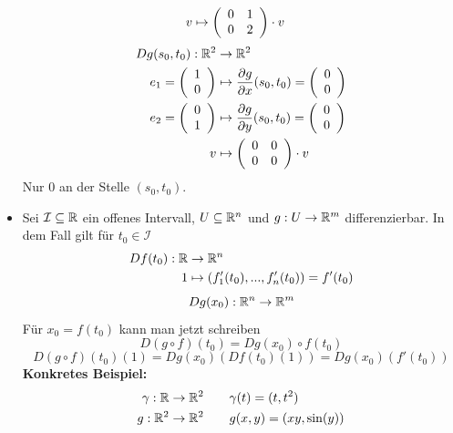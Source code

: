 \documentclass[main.tex]{subfiles}
\begin{document}
\begin{Beispiel}
\begin{itemize}
$$\begin{aligned}
          v & \mapsto \left(\begin{array}{c c} 0 & 1 \\ 0 & 2 \end{array}\right) \cdot v
        \end{aligned}$$
        $$\begin{aligned}
          Dg(s_0,t_0): \mathbb{R}^2 & \to \mathbb{R}^2 \\
          e_1  = \left(\begin{array}{c} 1 \\ 0 \end{array}\right) & \mapsto \dfrac{\partial g}{\partial x}(s_0,t_0) = \left(\begin{array}{c} 0 \\ 0 \end{array}\right) \\
          e_2  = \left(\begin{array}{c} 0 \\ 1 \end{array}\right) & \mapsto \dfrac{\partial g}{\partial y}(s_0,t_0) = \left(\begin{array}{c} 0 \\ 0 \end{array}\right) \\
          v & \mapsto \left(\begin{array}{c c} 0 & 0 \\ 0 & 0 \end{array}\right) \cdot v
        \end{aligned}$$
      Nur $0$ an der Stelle $(s_0,t_0)$.
    \item Sei $\mathcal{I} \subseteq \mathbb{R}$ ein offenes Intervall, $U \subseteq \mathbb{R}^n$ und $g: U \to \mathbb{R}^m$ differenzierbar.
      In dem Fall gilt für $t_0 \in \mathcal{I}$
      $$\begin{aligned}
        Df(t_0): \mathbb{R} & \to \mathbb{R}^n \\
        1 & \mapsto (f_1'(t_0), ..., f_n'(t_0)) = f'(t_0)
      \end{aligned}$$
      $$Dg(x_0): \mathbb{R}^n \to \mathbb{R}^m$$
      Für $x_0 = f(t_0)$ kann man jetzt schreiben
      $$D(g \circ f)(t_0) = Dg (x_0)\circ f(t_0)$$
      $$D(g \circ f)(t_0)(1) = Dg(x_0)(Df(t_0)(1)) = Dg (x_0) (f'(t_0))$$
      \textbf{Konkretes Beispiel:}
      $$\begin{aligned}
        \gamma: \mathbb{R} \to \mathbb{R}^2 & \qquad \gamma(t) = (t,t^2) \\
        g: \mathbb{R}^2 \to \mathbb{R}^2 & \qquad g(x,y) = (xy,\sin(y))
      \end{aligned}$$
  \end{itemize}
\end{Beispiel}
\end{document}
